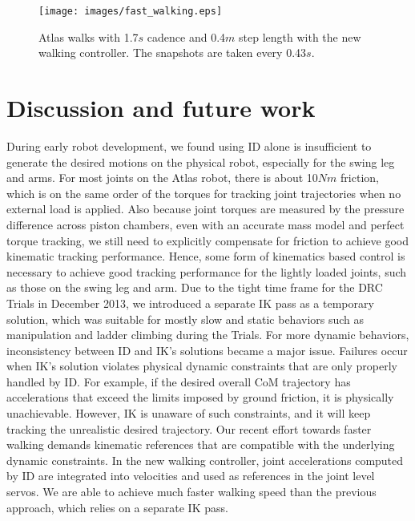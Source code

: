 \documentclass{ws-ijhr}
\begin{document}
\begin{figure} 
  \begin{center}
    {\texttt{[image: images/fast\_walking.eps]}}
    \caption{Atlas walks with 1.7$s$ cadence and 0.4$m$ step length with the
		new walking controller. The snapshots are taken every 0.43$s$.} 
		\label{fig:fast_walking}
  \end{center}
\end{figure}   


\section{Discussion and future work}
\label{sec:dis}
During early robot development, we found using ID alone is 
insufficient to generate the desired motions on the physical robot, especially 
for the swing leg and arms. 
For most joints on the Atlas robot, there is about 10$Nm$ friction, which is
on the same order of the torques for tracking joint trajectories when no external
load is applied.
Also because joint torques are measured by the pressure difference across piston 
chambers, even with an accurate mass model and perfect torque tracking, we still
need to explicitly compensate for friction to achieve good kinematic tracking
performance. 
Hence, some form of kinematics based control is necessary to achieve good  
tracking performance for the lightly loaded joints, such as those on the swing 
leg and arm.
Due to the tight time frame for the DRC Trials in December 2013, we introduced
a separate IK pass as a temporary solution, which was suitable for mostly slow and
static behaviors such as manipulation and ladder climbing during the Trials. 
For more dynamic behaviors, inconsistency between ID and IK's solutions became 
a major issue. 
Failures occur when IK's solution violates physical dynamic constraints that are 
only properly handled by ID. 
For example, if the desired overall CoM trajectory has accelerations that 
exceed the limits imposed by ground friction, it is physically unachievable. 
However, IK is unaware of such constraints, and it will keep tracking the 
unrealistic desired trajectory. 
Our recent effort towards faster walking demands kinematic references that are 
compatible with the underlying dynamic constraints. 
In the new walking controller, joint accelerations computed by ID are 
integrated into velocities and used as references in the joint level servos. 
We are able to achieve much faster walking speed than the previous approach, 
which relies on a separate IK pass. 
\end{document}
